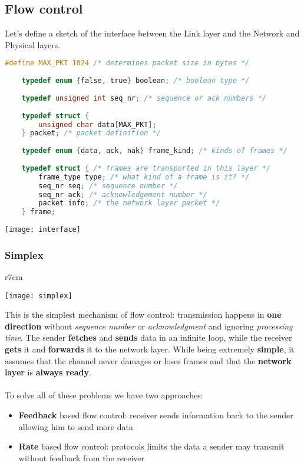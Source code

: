 \subsection{Flow control}
Let's define a sketch of the interface between the Link layer and the Network and Physical layers.
\begin{lstlisting}[language=C]
	#define MAX_PKT 1024 /* determines packet size in bytes */
	
	typedef enum {false, true} boolean; /* boolean type */
	
	typedef unsigned int seq_nr; /* sequence or ack numbers */
	
	typedef struct {
		unsigned char data[MAX_PKT];
	} packet; /* packet definition */
	
	typedef enum {data, ack, nak} frame_kind; /* kinds of frames */
	
	typedef struct { /* frames are transported in this layer */
		frame_type type; /* what kind of a frame is it? */
		seq_nr seq; /* sequence number */
		seq_nr ack; /* acknowledgement number */
		packet info; /* the network layer packet */
	} frame;
\end{lstlisting}
\begin{center}
	\texttt{[image: interface]}
\end{center}

\subsubsection{Simplex}
\begin{wrapfigure}[14]{r}{7cm}
	\begin{center}
		\texttt{[image: simplex]}
	\end{center}
\end{wrapfigure}
This is the simplest mechanism of flow control: transmission happens in \textbf{one direction} without \textit{sequence number} or \textit{acknowledgment} and ignoring \textit{processing time}. The sender \textbf{fetches} and \textbf{sends} data in an infinite loop, while the receiver \textbf{gets} it and \textbf{forwards} it to the network layer.
While being extremely \textbf{simple}, it assumes that the channel never damages or loses frames and that the \textbf{network layer} is \textbf{always ready}.\\\\
To solve all of these problems we have two approaches:
\begin{itemize}
	\item \textbf{Feedback} based flow control: receiver sends information back to the sender allowing him to send more data
	\item \textbf{Rate} based flow control: protocols limits the data a sender may transmit without feedback from the receiver
\end{itemize}

